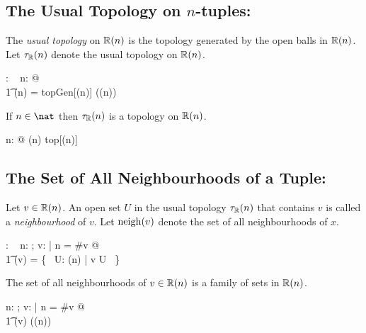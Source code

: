 \documentclass[11pt, oneside]{article}
\begin{document}
\subsection{The Usual Topology on $n$-tuples: }

The \textit{usual topology} on $\operatorname{\mathbb{R}}(n)$ is the topology generated by the open balls in $\operatorname{\mathbb{R}}(n)$.
Let $\tau_{\mathbb{R}}(n)$ denote the usual topology on $\operatorname{\mathbb{R}}(n)$.

\begin{axdef}
	\tauRtup: \nat \fun \family~\Rinf
\where
	\forall n: \nat @ \\
	\t1	\tauRtup(n) = topGen[\Rtup(n)] (\ballsRtup(n))
\end{axdef}

\begin{remark}

If $n \in \nat$ then $\tau_{\mathbb{R}}(n)$ is a topology on $\operatorname{\mathbb{R}}(n)$.

\begin{zed}
	\forall n: \nat @ \tauRtup(n) \in top[\Rtup(n)]
\end{zed}
\end{remark}

\subsection{The Set of All Neighbourhoods of a Tuple: }

Let $v \in \operatorname{\mathbb{R}}(n)$. 
An open set $U$ in the usual topology $\tau_{\mathbb{R}}(n)$ that contains $v$
is called a \textit{neighbourhood} of $v$.
Let $\operatorname{neigh}(v)$ denote the set of all neighbourhoods of $x$.

\begin{axdef}
\neighRinf: \Rinf \fun \family~\Rinf
\where
\forall n: \nat; v: \Rinf | n = \#v @ \\
\t1	\neighRinf(v) = \{~ U: \tauRtup(n) | v \in U ~\}
\end{axdef}

\begin{remark}

The set of all neighbourhoods of $v \in \operatorname{\mathbb{R}}(n)$ is a family of sets in $\operatorname{\mathbb{R}}(n)$.

\begin{zed}
\forall n: \nat; v: \Rinf | n = \#v @ \\
\t1	\neighRinf(v) \in \family(\Rtup(n))
\end{zed}

\end{remark}
\end{document}
